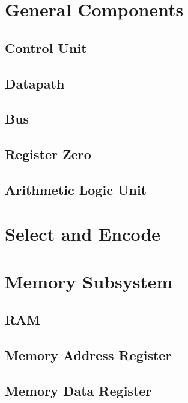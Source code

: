 \documentclass{article}
\begin{document}
\cleardoublepage

\appendix
\section{General Components}
    \subsection{Control Unit} \label{control_unit.v}
        
    \subsection{Datapath} \label{datapath.v}
        
    \subsection{Bus} \label{Bus.v}
         
    \subsection{Register Zero} \label{register_zero.v}
         
    \subsection{Arithmetic Logic Unit} \label{ALU.v}
        
\section{Select and Encode}
     \label{select_and_encode.v}
\section{Memory Subsystem}
    \subsection{RAM} \label{ram.v}
         
    \subsection{Memory Address Register} \label{MAR.v}
        
    \subsection{Memory Data Register} \label{MDR.v}
         
\end{document}

